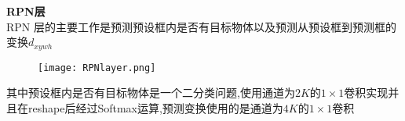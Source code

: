 





\begin{frame}
    \vspace{0.5em}
    \noindent\large\textbf{RPN层}\\
    \vspace{0.5em}
    RPN 层的主要工作是预测预设框内是否有目标物体以及预测从预设框到预测框的变换$d_{xywh}$
    \begin{figure}
        \texttt{[image: RPNlayer.png]}
    \end{figure}
    其中预设框内是否有目标物体是一个二分类问题,使用通道为$2K$的$1\times 1$卷积实现并且在reshape后经过Softmax运算,预测变换使用的是通道为$4K$的$1\times 1$卷积


\end{frame}

